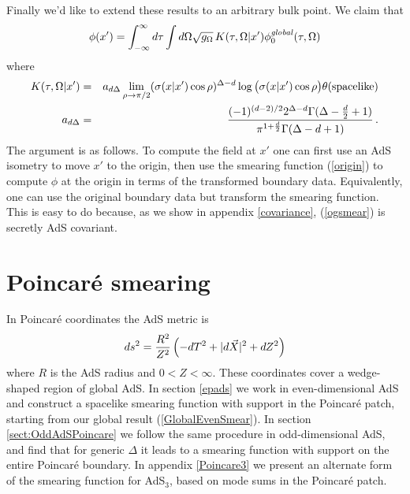 \documentclass[12pt]{article}
\newcommand{\phinotg} [1]{{\phi_{0#1}^{\it global}}}
\begin{document}
Finally we'd like to extend these results to an arbitrary bulk point.  We claim that
\begin{equation} \label{ogsmear}
\phi(x') = \int_{-\infty}^{\infty} d\tau \int d\Omega \sqrt{g_\Omega} \, K(\tau,\Omega \vert x') \phinotg{}(\tau,\Omega)
\end{equation}
where
\begin{eqnarray}
\nonumber
K(\tau,\Omega \vert x') &=& a_{d \Delta} \lim_{\rho \rightarrow \pi/2} (\sigma(x \vert x') \cos \rho)^{\Delta - d}
\log \big(\sigma(x \vert x') \cos \rho\big) \theta({\rm spacelike}) \\
\label{GlobalOddSmear}
 a_{d \Delta} &=& {(-1)^{(d - 2)/2} 2^{\Delta - d} \Gamma(\Delta - {d \over 2} + 1)
\over \pi^{1 + {d \over 2}} \Gamma(\Delta - d + 1)}\,.
\end{eqnarray}
The argument is as follows.  To compute the field at $x'$ one can
first use an AdS isometry to move $x'$ to the origin, then use the
smearing function (\ref{origin}) to compute $\phi$ at the origin in
terms of the transformed boundary data.  Equivalently, one can use the
original boundary data but transform the smearing function.  This is
easy to do because, as we show in appendix \ref{covariance},
(\ref{ogsmear}) is secretly AdS covariant.

\section{Poincar\'e smearing} \label{pads}

In Poincar\'e coordinates the AdS metric is
\[
ds^2 = {R^2 \over Z^2} \left(-dT^2 + \vert d\vec{X} \vert^2 + dZ^2\right)
\]
where $R$ is the AdS radius and $0 < Z < \infty$.  These coordinates
cover a wedge-shaped region of global AdS.  In section \ref{epads} we
work in even-dimensional AdS and construct a spacelike smearing
function with support in the Poincar\'e patch, starting from our
global result (\ref{GlobalEvenSmear}).  In section
\ref{sect:OddAdSPoincare} we follow the same procedure in
odd-dimensional AdS, and find that for generic $\Delta$ it leads to a
smearing function with support on the entire Poincar\'e boundary.  In
appendix \ref{Poincare3} we present an alternate form of the smearing
function for AdS${}_3$, based on mode sums in the Poincar\'e patch.
\end{document}
